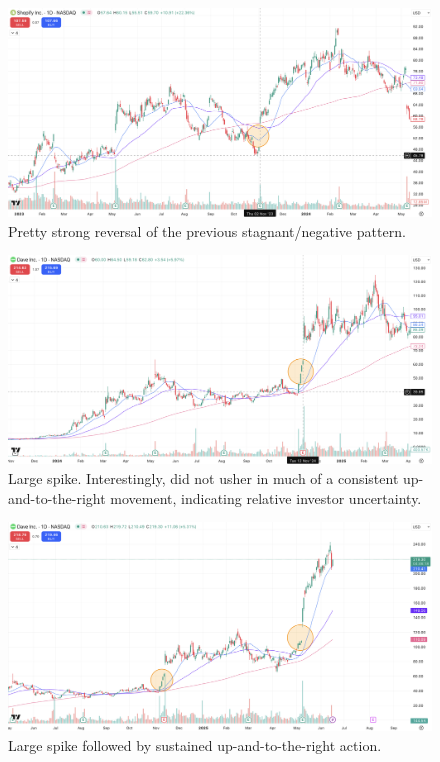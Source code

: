 \documentclass[11pt]{article}
\begin{document}
    \begin{figure}[H]
        \centering
        \includegraphics[width=1.0\linewidth]{images/SHOP2.png}
        \caption{Pretty strong reversal of the previous stagnant/negative pattern.}
        \label{fig:SHOP2}
    \end{figure}

    \begin{figure}[H]
        \centering
        \includegraphics[width=1.0\linewidth]{images/DAVE1.png}
        \caption{Large spike. Interestingly, did not usher in much of a consistent up-and-to-the-right movement, indicating relative investor uncertainty.}
        \label{fig:DAVE1}
    \end{figure}

    \begin{figure}[H]
        \centering
        \includegraphics[width=1.0\linewidth]{images/DAVE2.png}
        \caption{Large spike followed by sustained up-and-to-the-right action.}
        \label{fig:DAVE2}
    \end{figure}
\end{document}
